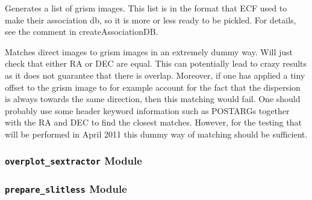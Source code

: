 \documentclass[letterpaper,10pt,english]{sphinxmanual}
\begin{document}

\begin{fulllineitems}
\label{SamPy.grisms:SamPy.grisms.generateAssociationDB.makeGrismImageList}
Generates a list of grism images. This list is in the
format that ECF used to make their association db, so it
is more or less ready to be pickled. For details,
see the comment in createAssociationDB.

\end{fulllineitems}



\begin{fulllineitems}
\label{SamPy.grisms:SamPy.grisms.generateAssociationDB.matchDirectImageToGrismImage}
Matches direct images to grism images in an extremely
dummy way. Will just check that either RA or DEC are
equal. This can potentially lead to crazy results as
it does not guarantee that there is overlap. Moreover,
if one has applied a tiny offset to the grism image to
for example account for the fact that the dispersion
is always towards the same direction, then this matching
would fail. One should probably use some header keyword
information such as POSTARGs together with the RA and DEC
to find the closest matches. However, for the testing
that will be performed in April 2011 this dummy way of
matching should be sufficient.

\end{fulllineitems}



\subsubsection{\texttt{overplot\_sextractor} Module}
\label{SamPy.grisms:module-SamPy.grisms.overplot_sextractor}\label{SamPy.grisms:overplot-sextractor-module}

\subsubsection{\texttt{prepare\_slitless} Module}
\label{SamPy.grisms:prepare-slitless-module}
\end{document}

